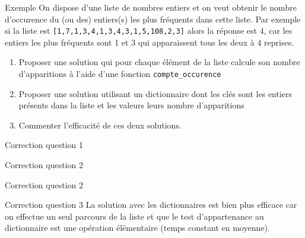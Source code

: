 \documentclass[10pt]{beamer}
\begin{document}
\begin{frame}{\Ctitle}{\stitle}
	\begin{exampleblock}{Exemple}
		On dispose d'une liste de nombres entiers et on veut obtenir le nombre d'occurence du (ou des) entiers(s) les plus fréquents dans cette liste. Par exemple si la liste est {\tt [1,7,1,3,4,1,3,4,3,1,5,108,2,3]} alors la réponse est 4, car les entiers les plus fréquents sont 1 et 3 qui apparaissent tous les deux à 4 reprises.
		\begin{enumerate}
			\item<1-> Proposer une solution qui pour chaque élément de la liste calcule son nombre d'apparitions à l'aide d'une fonction {\tt compte\_occurence}
			\item<2-> Proposer une solution utilisant un dictionnaire dont les clés sont les entiers présents dans la liste et les valeurs leurs nombre d'apparitions
			\item<3-> Commenter l'efficacité de ces deux solutions.
		\end{enumerate}
	\end{exampleblock}
\end{frame}

\begin{frame}{\Ctitle}{\stitle}
	\begin{exampleblock}{Correction question 1}
	\end{exampleblock}
\end{frame}

\begin{frame}{\Ctitle}{\stitle}
	\begin{exampleblock}{Correction question 2}
	\end{exampleblock}
\end{frame}

\begin{frame}{\Ctitle}{\stitle}
	\begin{exampleblock}{Correction question 2}
	\end{exampleblock}
\end{frame}


\begin{frame}{\Ctitle}{\stitle}
	\begin{exampleblock}{Correction question 3}
		La solution avec les dictionnaires est bien plus efficace car on effectue un seul parcours de la liste et que le test d'appartenance au dictionnaire est une opération élémentaire (temps constant en moyenne).

	\end{exampleblock}
\end{frame}
\end{document}

